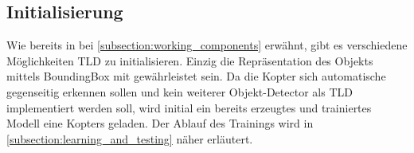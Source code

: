 	\subsection{Initialisierung}
	\label{subsection:tld_init}
	Wie bereits in bei \ref{subsection:working_components} erwähnt, gibt es verschiedene Möglichkeiten TLD zu initialisieren. Einzig die Repräsentation des Objekts mittels BoundingBox mit gewährleistet sein. Da die Kopter sich automatische gegenseitig erkennen sollen und kein weiterer Objekt-Detector als TLD implementiert werden soll, wird initial ein bereits erzeugtes und trainiertes Modell eine Kopters geladen. Der Ablauf des Trainings wird in \ref{subsection:learning_and_testing} näher erläutert.